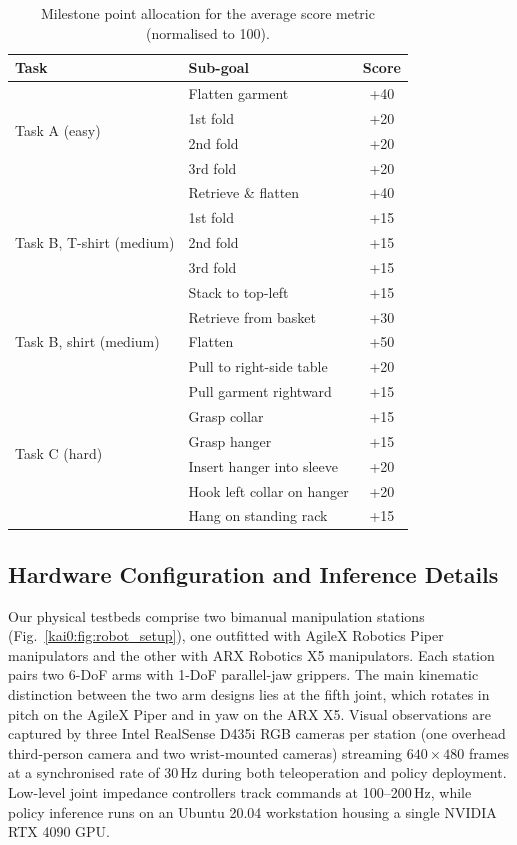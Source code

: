 \begin{table}[tb]
  \centering
  \caption{Milestone point allocation for the average score metric (normalised to 100).}
  \label{kai0:tab:score}
  \begin{tabular}{llc}
    \toprule
    \textbf{Task} & \textbf{Sub-goal} & \textbf{Score} \\
    \midrule
    \multirow{4}{*}{Task A (easy)}
      & Flatten garment & +40 \\
      & 1st fold & +20 \\
      & 2nd fold & +20 \\
      & 3rd fold & +20 \\
    \midrule
    \multirow{5}{*}{Task B, T-shirt (medium)}
      & Retrieve \& flatten & +40 \\
      & 1st fold & +15 \\
      & 2nd fold & +15 \\
      & 3rd fold & +15 \\
      & Stack to top-left & +15 \\
    \midrule
    \multirow{3}{*}{Task B, shirt (medium)}
      & Retrieve from basket & +30 \\
      & Flatten & +50 \\
      & Pull to right-side table & +20 \\
    \midrule
    \multirow{6}{*}{Task C (hard)}
      & Pull garment rightward & +15 \\
      & Grasp collar & +15 \\
      & Grasp hanger & +15 \\
      & Insert hanger into sleeve & +20 \\
      & Hook left collar on hanger & +20 \\
      & Hang on standing rack & +15 \\
    \bottomrule
  \end{tabular}
\end{table}

\subsection{Hardware Configuration and Inference Details}\label{kai0:app:hardware}
Our physical testbeds comprise two bimanual manipulation stations (Fig.~\ref{kai0:fig:robot_setup}), one outfitted with AgileX Robotics Piper manipulators and the other with ARX Robotics X5 manipulators. Each station pairs two 6-DoF arms with 1-DoF parallel-jaw grippers. The main kinematic distinction between the two arm designs lies at the fifth joint, which rotates in pitch on the AgileX Piper and in yaw on the ARX X5. Visual observations are captured by three Intel RealSense D435i RGB cameras per station (one overhead third-person camera and two wrist-mounted cameras) streaming $640 \times 480$ frames at a synchronised rate of 30\,Hz during both teleoperation and policy deployment. Low-level joint impedance controllers track commands at 100--200\,Hz, while policy inference runs on an Ubuntu 20.04 workstation housing a single NVIDIA RTX 4090 GPU.

